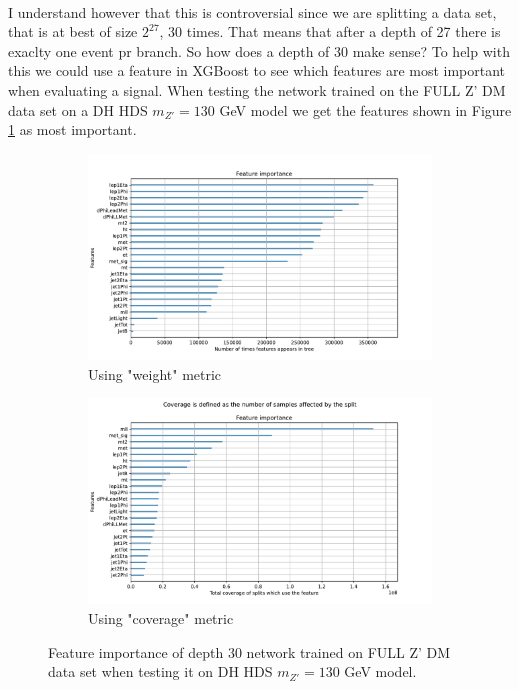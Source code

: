\documentclass[14pt, a4paper]{book}
\begin{document}
\\ I understand however that this is controversial since we are splitting a data set, that is at best of size $2^{27}$, 30 times. That means that after a depth of 27 there is exaclty one event pr branch.
So how does a depth of 30 make sense? To help with this we could use a feature in XGBoost to see which features are most important when evaluating a signal. 
When testing the network trained on the FULL Z' DM data set on a DH HDS $m_{Z'}=130$ GeV model we get the features shown in Figure \ref{fig:DBDT_feat} as most important. 
\graphicspath{{../../../Plots/XGBoost/FULL/DH_HDS_mZp_130/feature_importance}}
\begin{figure}[!ht]
	\centering
   \begin{subfigure}[b]{0.8\textwidth}
      \centering
      \includegraphics[width=1\textwidth]{weight.pdf}
      \caption{Using "weight" metric}
   \end{subfigure}
   \hfill
   \begin{subfigure}[b]{0.8\textwidth}
      \centering
      \includegraphics[width=1\textwidth]{total_cover.pdf}
      \caption{Using "coverage" metric}
   \end{subfigure}
   \caption{Feature importance of depth 30 network trained on FULL Z' DM data set when testing it on DH HDS $m_{Z'}=130$ GeV model.}\label{fig:DBDT_feat}
\end{figure}
\end{document}
